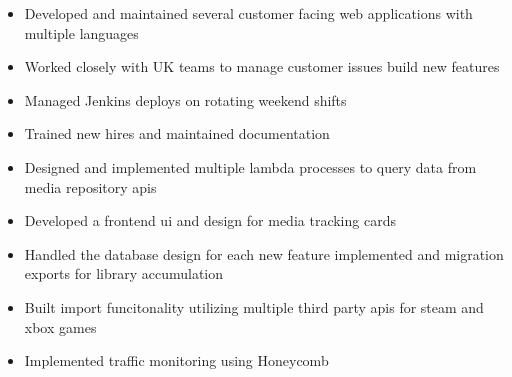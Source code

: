 \documentclass[10pt,a4paper,ragged2e]{altacv}
\begin{document}


\begin{fullwidth}
\makecvheader
\end{fullwidth}



\begin{itemize}
\item Developed and maintained several customer facing web applications with multiple languages
\item Worked closely with UK teams to manage customer issues build new features
\item Managed Jenkins deploys on rotating weekend shifts
\item Trained new hires and maintained documentation
\end{itemize}

\divider

\begin{itemize}
\item Designed and implemented multiple lambda processes to query data from media repository apis
\item Developed a frontend ui and design for media tracking cards 
\item Handled the database design for each new feature implemented and migration exports for library accumulation
\item Built import funcitonality utilizing multiple third party apis for steam and xbox games
\item Implemented traffic monitoring using Honeycomb
\end{itemize}
\end{document}
